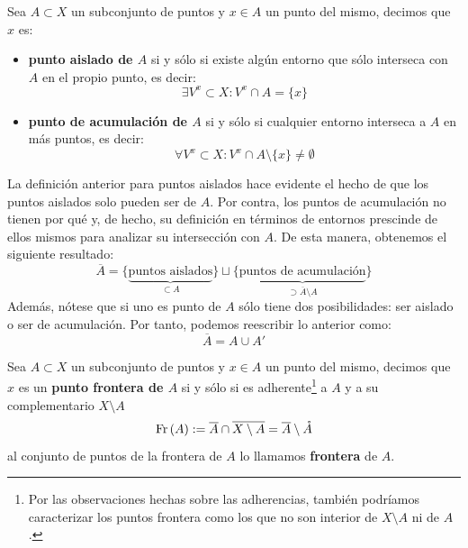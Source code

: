 \begin{defi}[Acumulación]    
Sea $A\subset X$ un subconjunto de puntos y $x\in A$ un punto del mismo, decimos que $x$ es:
\begin{itemize}
\item \textbf{punto aislado de $A$} si y sólo si existe algún entorno que sólo interseca con $A$ en el propio punto, es decir:
$$
\exists V^x \subset X : V^x \cap A = \{x\}
$$
\item \textbf{punto de acumulación de $A$} si y sólo si cualquier entorno interseca a $A$ en más puntos, es decir:
$$
\forall V^x \subset X : V^x \cap A \setminus \{x\} \neq \emptyset
$$
\end{itemize}
\end{defi}

\begin{obs}
La definición anterior para puntos aislados hace evidente el hecho de que los puntos aislados solo pueden ser de $A$. Por contra, los puntos de acumulación no tienen por qué y, de hecho, su definición en términos de entornos prescinde de ellos mismos para analizar su intersección con $A$. De esta manera, obtenemos el siguiente resultado:
$$
\overline{A} = \{\underbrace{\text{puntos aislados}}_{\subset A}\} \sqcup \{\underbrace{\text{puntos de acumulación}}_{\supset \overline{A} \setminus A}\}
$$
Además, nótese que si uno es punto de $A$ sólo tiene dos posibilidades: ser aislado o ser de acumulación. Por tanto, podemos reescribir lo anterior como:
$$
\overline{A} = A \cup A'
$$
\end{obs}

\begin{defi}[Frontera]
Sea $A\subset X$ un subconjunto de puntos y $x\in A$ un punto del mismo, decimos que $x$ es un \textbf{punto frontera de $A$} si y sólo si es adherente\footnote{Por las observaciones hechas sobre las adherencias, también podríamos caracterizar los puntos frontera como los que no son interior de $X \setminus A$ ni de $A$.} a $A$ y a su complementario $X \setminus A$
    \[
    \operatorname{Fr}\left( A \right) := \overline{A} \cap \overline{X \setminus A} = \overline{A} \setminus \mathring{A}     
    \]
al conjunto de puntos de la frontera de $A$ lo llamamos \textbf{frontera} de $A$.
\end{defi}

